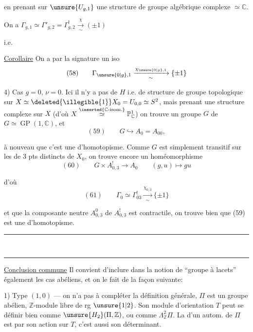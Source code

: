 en prenant sur $\unsure{U_{g,1}}$ une structure de groupe algébrique complexe $\simeq\mathbb{C}$.

On a $\Gamma_{g,1}\simeq\Gamma'_{g,2}=\Gamma^!_{g,2}\xrightarrow[\sim]{\chi}(\pm1)$

i.e.

\uline{Corollaire} On a par la signature un iso
\[
(58)\qquad\Gamma_{\unsure{0|g},1}\xrightarrow[\sim]{\chi_{\unsure{0|g},1}}\{\pm1\}
\]

4) Cas $g=0$, $\nu=0$. Ici il n'y a pas de $H$ i.e. de structure de groupe topologique sur $X\simeq\deleted{\illegible{1}}X_0=U_{0,0}\simeq S^2$, mais prenant une structure complexe sur $X$ (d'où $X\overset{\inserted{\mathbb{C}\text{-isom.}}}{\simeq}\mathbb{P}^1_{\mathbb{C}}$) on trouve un groupe $G$ de   $G\simeq\operatorname{GP}(1,\mathbb{C})$, et
\[
(59)\qquad G\hookrightarrow A_0=A_{00},
\]

 à nouveau que c'est une  d'homotopisme. Comme $G$ est simplement transitif sur les   de $3$ pts distincts de $X_0$, on trouve encore un homéomorphisme
\[
(60)\qquad G\times A^!_{0,3}\longrightarrow A_0\qquad(g,u)\longmapsto gu
\]

d'où
\[
(61)\qquad\Gamma_0\simeq\Gamma^!_{03}\xrightarrow[\sim]{\chi_{0,3}}\{\pm1\}
\]

et  que la composante neutre $A^0_{0,3}$ de $A^!_{0,3}$ est contractile, on trouve bien  que (59) est une  d'homotopisme.
\begin{center}\rule{1.2cm}{0.25pt}\\[-0.8em]\rule{1.2cm}{0.25pt}\end{center}

\uline{Conclusion commune}  Il convient d'inclure dans la notion de ``groupe à lacets'' également les  cas abéliens, et on le fait de la façon suivante:

1) Type $(1,0)$ --- on n'a pas à compléter la définition générale,  $\Pi$ est un groupe abélien, $\mathbb{Z}$-module libre de rg $\unsure{1|2}$. Son module d'orientation $T$ peut se définir bien comme $\unsure{H_2}(\Pi,\mathbb{Z})$, ou comme $\Lambda^2_{\mathbb{Z}}\Pi$. La   d'un autom. de $\Pi$ est  par son action sur $T$, c'est aussi son déterminant.

